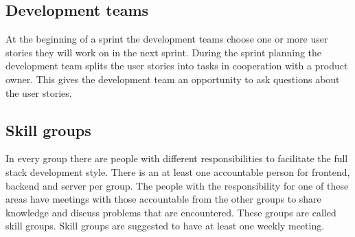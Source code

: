 \subsection{Development teams}
At the beginning of a sprint the development teams choose one or more user stories they will work on in the next sprint.
During the sprint planning the development team splits the user stories into tasks in cooperation with a product owner.
This gives the development team an opportunity to ask questions about the user stories.

\subsection{Skill groups}
In every group there are people with different responsibilities to facilitate the full stack development style.
There is an at least one accountable person for frontend, backend and server per group.
The people with the responsibility for one of these areas have meetings with those accountable from the other groups to share knowledge and discuss problems that are encountered.
These groups are called skill groups.
Skill groups are suggested to have at least one weekly meeting.
